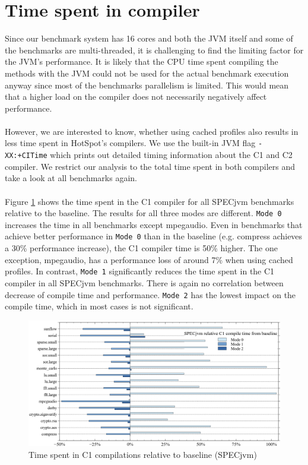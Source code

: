 \section{Time spent in compiler}
\label{s:perf_compiletime}
Since our benchmark system has 16 cores and both the JVM itself and some of the benchmarks are multi-threaded, it is challenging to find the limiting factor for the JVM's performance. It is likely that the CPU time spent compiling the methods with the JVM could not be used for the actual benchmark execution anyway since most of the benchmarks parallelism is limited.
This would mean that a higher load on the compiler does not necessarily negatively affect performance.
\\\\
However, we are interested to know, whether using cached profiles also results in less time spent in HotSpot's compilers.
We use the built-in JVM flag \texttt{-XX:+CITime} which prints out detailed timing information about the C1 and C2 compiler.
We restrict our analysis to the total time spent in both compilers and take a look at all benchmarks again.
\\\\
Figure \ref{f:all_variation_compiletime_c1} shows the time spent in the C1 compiler for all SPECjvm benchmarks relative to the baseline. The results for all three modes are different. \texttt{Mode 0} increases the time in all benchmarks except mpegaudio. Even in benchmarks that achieve better performance in \texttt{Mode 0} than in the baseline (e.g. compress achieves a 30\% performance increase), the C1 compiler time is 50\% higher. The one exception, mpegaudio, has a performance loss of around 7\% when using cached profiles.
In contrast, \texttt{Mode 1} significantly reduces the time spent in the C1 compiler in all SPECjvm benchmarks. There is again no correlation between decrease of compile time and performance.
\texttt{Mode 2} has the lowest impact on the compile time, which in most cases is not significant.
\begin{figure}[ht!]
  \begin{center}
    \centering
    \includegraphics[width=1.0\textwidth]{figures/all_variation_compiletime_c1.png}
    \caption{Time spent in C1 compilations relative to baseline (SPECjvm)}
    \label{f:all_variation_compiletime_c1}
  \end{center}
\end{figure}
